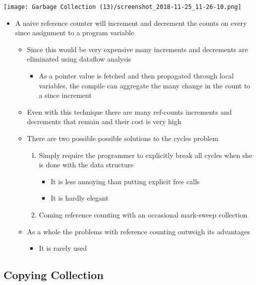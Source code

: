 \documentclass[11pt]{article}
\begin{document}
\begin{center}
\texttt{[image: Garbage Collection (13)/screenshot\_2018-11-25\_11-26-10.png]}
\end{center}

\begin{itemize}
\item A naive reference counter will increment and decrement the counts on every since assignment to a program variable
\begin{itemize}
\item Since this would be very expensive many increments and decrements are eliminated using dataflow analysis
\begin{itemize}
\item As a pointer value is fetched and then propagated through local variables, the compile can aggregate the many change in the count to a since increment
\end{itemize}
\item Even with this technique there are many ref-counts increments and decrements that remain and their cost is very high
\item There are two possible possible solutions to the cycles problem
\begin{enumerate}
\item Simply require the programmer to explicitly break all cycles when she is done with the data structure
\begin{itemize}
\item It is less annoying than putting explicit free calls
\item It is hardly elegant
\end{itemize}
\item Coming reference counting with an occasional mark-sweep collection
\end{enumerate}
\item As a whole the problems with reference counting outweigh its advantages
\begin{itemize}
\item It is rarely used
\end{itemize}
\end{itemize}
\end{itemize}

\subsection{Copying Collection}
\label{sec:org5ba001d}
\end{document}

